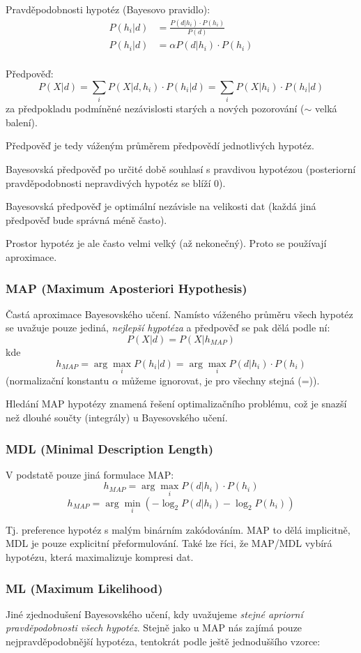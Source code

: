 \documentclass[11pt]{report} %
\numberwithin{equation}{section}
\begin{document}
Pravděpodobnosti hypotéz (Bayesovo pravidlo):
\begin{align*}
	P(h_i|d) &= \frac{P(d|h_i)\cdot P(h_i)}{P(d)}\\
	P(h_i|d) &= \alpha P(d|h_i)\cdot P(h_i)\\
\end{align*}

Předpověď:
$$P(X|d) = \sum_{i} P(X|d,h_i)\cdot P(h_i|d) = \sum_{i} P(X|h_i)\cdot P(h_i|d)$$
za předpokladu podmíněné nezávislosti starých a nových pozorování ($\sim$ velká balení).

Předpověď je tedy váženým průměrem předpovědí jednotlivých hypotéz.

Bayesovská předpověď po určité době souhlasí s pravdivou hypotézou (posteriorní pravděpodobnosti nepravdivých hypotéz se blíží 0). 

Bayesovská předpověď je optimální nezávisle na velikosti dat (každá jiná předpověď bude správná méně často).

Prostor hypotéz je ale často velmi velký (až nekonečný). Proto se používají aproximace.

\subsubsection{MAP (Maximum Aposteriori Hypothesis)}
Častá aproximace Bayesovského učení. Namísto váženého průměru všech hypotéz se uvažuje pouze jediná, \textit{nejlepší hypotéza} a předpověď se pak dělá podle ní:
$$P(X|d) = P(X|h_{MAP})$$
kde 
$$h_{MAP} = \arg\max_i P(h_i|d) = \arg\max_i P(d|h_i)\cdot P(h_i)$$
(normalizační konstantu $\alpha$ můžeme ignorovat, je pro všechny stejná (=)).

Hledání MAP hypotézy znamená řešení optimalizačního problému, což je snazší než dlouhé součty (integrály) u Bayesovského učení.

\subsubsection{MDL (Minimal Description Length)}
V podstatě pouze jiná formulace MAP: 
$$h_{MAP} = \arg\max_i P(d|h_i)\cdot P(h_i)$$
$$h_{MAP} = \arg\min_i (-\log_2P(d|h_i)-\log_2 P(h_i))$$

Tj. preference hypotéz s malým binárním zakódováním. MAP to dělá implicitně, MDL je pouze explicitní přeformulování. Také lze říci, že MAP/MDL vybírá hypotézu, která maximalizuje kompresi dat.


\subsubsection{ML (Maximum Likelihood)}
Jiné zjednodušení Bayesovského učení, kdy uvažujeme \textit{stejné apriorní pravděpodobnosti všech hypotéz}. Stejně jako u MAP nás zajímá pouze nejpravděpodobnější hypotéza, tentokrát podle ještě jednoduššího vzorce:
\end{document}
